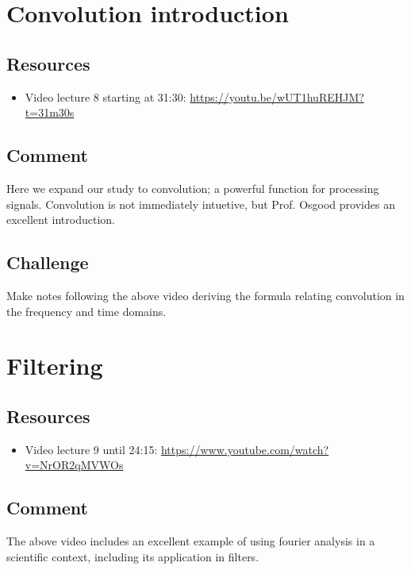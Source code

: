 \newpage
\section{Convolution introduction}

\subsection*{Resources}
\begin{itemize}
    \item Video lecture 8 starting at 31:30: \url{https://youtu.be/wUT1huREHJM?t=31m30s}
\end{itemize}

\subsection*{Comment}
Here we expand our study to convolution; a powerful function for processing signals. Convolution is not immediately intuetive, but Prof. Osgood provides an excellent introduction.

\subsection*{Challenge}
Make notes following the above video deriving the formula relating convolution in the frequency and time domains.

\timebox




\newpage
\section{Filtering}

\subsection*{Resources}
\begin{itemize}
    \item Video lecture 9 until 24:15: \url{https://www.youtube.com/watch?v=NrOR2qMVWOs}
\end{itemize}

\subsection*{Comment}
The above video includes an excellent example of using fourier analysis in a scientific context, including its application in filters.

